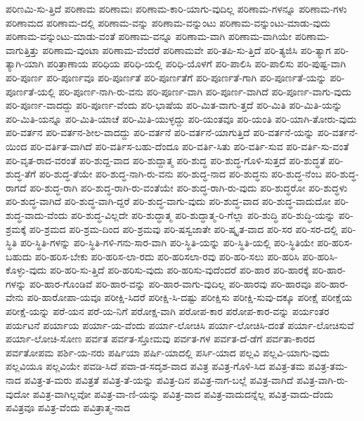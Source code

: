 {ಪರಿಣಮಿ-ಸು-ತ್ತಿದೆ
ಪರಿಣಾಮ
ಪರಿಣಾಮಃ
ಪರಿಣಾಮ-ಕಾರಿ-ಯಾಗು-ವುದಿಲ್ಲ
ಪರಿಣಾಮ-ಗಳನ್ನೂ
ಪರಿಣಾಮ-ಗಳು
ಪರಿಣಾಮದ
ಪರಿಣಾಮ-ದಲ್ಲಿ
ಪರಿಣಾಮ-ವನ್ನು
ಪರಿಣಾಮ-ವನ್ನುಂಟು
ಪರಿಣಾಮ-ವನ್ನುಂಟು-ಮಾಡು-ವುದು
ಪರಿಣಾಮ-ವನ್ನುಂಟು-ಮಾಡು-ವಂತೆ
ಪರಿಣಾಮ-ವನ್ನೂ
ಪರಿಣಾಮ-ವಾಗಿ
ಪರಿಣಾಮ-ವಾಗಿಯೇ
ಪರಿಣಾಮ-ವಾಗುತ್ತಿತ್ತು
ಪರಿಣಾಮ-ವುಂಟಾ
ಪರಿಣಾಮ-ವೆಂದರೆ
ಪರಿಣಾಮವೇ
ಪರಿ-ತಪಿ-ಸು-ತ್ತಿದೆ
ಪರಿ-ತ್ಯಜಿಸಿ
ಪರಿ-ತ್ಯಾಗ
ಪರಿ-ತ್ಯಾಗಿ-ಯಾಗಿ
ಪರಿತ್ರಾಣಾಯ
ಪರಿಧಿಯ
ಪರಿಧಿ-ಯಲ್ಲಿ
ಪರಿಧಿ-ಯೊಳಗೆ
ಪರಿ-ಪಾಲಿಸಿ
ಪರಿ-ಪಾಲಿಸು
ಪರಿ-ಪುಷ್ಟ-ವಾಗಿ
ಪರಿ-ಪೂರ್ಣ
ಪರಿ-ಪೂರ್ಣವೂ
ಪರಿ-ಪೂರ್ಣತೆ
ಪರಿ-ಪೂರ್ಣತೆಗೆ
ಪರಿ-ಪೂರ್ಣತೆ-ಗಾಗಿ
ಪರಿ-ಪೂರ್ಣತೆ-ಯನ್ನು
ಪರಿ-ಪೂರ್ಣತೆ-ಯಲ್ಲಿ
ಪರಿ-ಪೂರ್ಣ-ನಾಗಿ-ರು-ವನು
ಪರಿ-ಪೂರ್ಣ-ವಾಗಿ
ಪರಿ-ಪೂರ್ಣ-ವಾಗಿದೆ
ಪರಿ-ಪೂರ್ಣ-ವಾಗು-ವುದು
ಪರಿ-ಪೂರ್ಣ-ವಾದದ್ದು
ಪರಿ-ಪೂರ್ಣ-ವೆಂದು
ಪರಿ-ಭಾಷೆಯ
ಪರಿ-ಮಿತ-ವಾಗು-ತ್ತದೆ
ಪರಿ-ಮಿತಿ
ಪರಿ-ಮಿತಿ-ಯನ್ನು
ಪರಿ-ಮಿತಿ-ಯನ್ನೂ
ಪರಿ-ಮಿತಿ-ಯಾಚೆ
ಪರಿ-ಮಿತಿ-ಯುಳ್ಳದ್ದು
ಪರಿ-ಯಂತವೂ
ಪರಿ-ಯಂತಿ
ಪರಿ-ಯಾಗಿ-ತೋರು-ವುದು
ಪರಿ-ವರ್ತನ
ಪರಿ-ವರ್ತನ-ಶೀಲ-ವಾದದ್ದು
ಪರಿ-ವರ್ತನೆ
ಪರಿ-ವರ್ತನೆ-ಯಾಗುತ್ತಿದೆ
ಪರಿ-ವರ್ತನೆ-ಯನ್ನು
ಪರಿ-ವರ್ತನೆ-ಯಿಂದ
ಪರಿ-ವರ್ತಿತ-ವಾಗಿದೆ
ಪರಿ-ವರ್ತಿಸ-ಬಹು-ದೆಂದೂ
ಪರಿ-ವರ್ತಿ-ಸಿತು
ಪರಿ-ವರ್ತಿ-ಸುವ
ಪರಿ-ವರ್ತಿ-ಸು-ವಂತೆ
ಪರಿ-ವೃತ-ರಾದ-ವರಂತೆ
ಪರಿ-ಶುದ್ದ-ವಾದ
ಪರಿ-ಶುದ್ದಾತ್ಮ
ಪರಿ-ಶುದ್ಧ
ಪರಿ-ಶುದ್ಧ-ಗೊಳಿ-ಸುತ್ತದೆ
ಪರಿ-ಶುದ್ಧತೆ
ಪರಿ-ಶುದ್ಧ-ತೆಗೆ
ಪರಿ-ಶುದ್ಧ-ತೆಯೇ
ಪರಿ-ಶುದ್ಧ-ನಾಗಿ-ರು-ವನು
ಪರಿ-ಶುದ್ಧ-ನಾದ
ಪರಿ-ಶುದ್ಧನು
ಪರಿ-ಶುದ್ಧ-ನೆಂಬ
ಪರಿ-ಶುದ್ಧ-ರಾಗದೆ
ಪರಿ-ಶುದ್ಧ-ರಾಗಿ
ಪರಿ-ಶುದ್ಧ-ರಾಗಿ-ರು-ವಂತೆಯೇ
ಪರಿ-ಶುದ್ಧ-ರಾಗಿ-ರು-ವುದು
ಪರಿ-ಶುದ್ಧರೋ
ಪರಿ-ಶುದ್ಧಳು
ಪರಿ-ಶುದ್ಧ-ವಾಗಿದೆ
ಪರಿ-ಶುದ್ಧ-ವಾಗಿ-ದ್ದರೆ
ಪರಿ-ಶುದ್ಧ-ವಾಗು-ವುದು
ಪರಿ-ಶುದ್ಧ-ವಾದ
ಪರಿ-ಶುದ್ಧ-ವಾದುದೋ
ಪರಿ-ಶುದ್ಧ-ವಾದು-ವೆಂದು
ಪರಿ-ಶುದ್ಧ-ವಿಲ್ಲದೇ
ಪರಿ-ಶುದ್ಧಾತ್ಮ
ಪರಿ-ಶುದ್ಧಾತ್ಮ-ರಿ-ಗೆಲ್ಲಾ
ಪರಿ-ಶುದ್ಧಿ
ಪರಿ-ಶುದ್ಧಿ-ಯನ್ನು
ಪರಿ-ಶ್ರಮಕ್ಕೆ
ಪರಿ-ಶ್ರಮದ
ಪರಿ-ಶ್ರಮ-ದಿಂದ
ಪರಿ-ಶ್ರಮವು
ಪರಿ-ಷಸ್ವಜಾತೇ
ಪರಿ-ಷ್ಕೃತ-ವಾದ
ಪರಿ-ಸರ
ಪರಿ-ಸರ-ದಲ್ಲಿ
ಪರಿ-ಸ್ಥಿತಿ
ಪರಿ-ಸ್ಥಿತಿ-ಗಳನ್ನು
ಪರಿ-ಸ್ಥಿತಿ-ಗಳಿ-ಗನು-ಸಾರ-ವಾಗಿ
ಪರಿ-ಸ್ಥಿತಿ-ಯನ್ನು
ಪರಿ-ಸ್ಥಿತಿ-ಯಲ್ಲಿ
ಪರಿ-ಸ್ಥಿತಿಯೇ
ಪರಿ-ಹರಿಸ-ಬಹುದು
ಪರಿ-ಹರಿಸ-ಬೇಕು
ಪರಿ-ಹರಿಸ-ಲಾ-ರದು
ಪರಿ-ಹರಿಸಲಾ-ರವು
ಪರಿ-ಹರಿ-ಸಲು
ಪರಿ-ಹರಿಸಿ
ಪರಿ-ಹರಿಸಿ-ಕೊಳ್ಳು-ವುದು
ಪರಿ-ಹರಿ-ಸು-ತ್ತಿದೆ
ಪರಿ-ಹರಿಸು-ವುದು
ಪರಿ-ಹರಿಸು-ವುದೆಂದರೆ
ಪರಿ-ಹಾರ
ಪರಿ-ಹಾರಕ್ಕೆ
ಪರಿ-ಹಾರ-ಗಳನ್ನು
ಪರಿ-ಹಾರ-ಗೊಂಡಿವೆ
ಪರಿ-ಹಾರ-ವನ್ನು
ಪರಿ-ಹಾರ-ವಾಗು-ವುದಿಲ್ಲ
ಪರಿ-ಹಾರವು
ಪರಿ-ಹಾರವೂ
ಪರಿ-ಹಾರ-ವೇನು
ಪರಿ-ಹಾರೋಪಾ-ಯವೂ
ಪರೀಕ್ಷಿ-ಸಿದರೆ
ಪರೀಕ್ಷಿ-ಸಿ-ದಷ್ಟು
ಪರೀಕ್ಷಿಸು
ಪರೀಕ್ಷಿ-ಸುವು-ದಕ್ಕೂ
ಪರೀಕ್ಷೆ
ಪರೀಕ್ಷೆಯ
ಪರೀಕ್ಷೆ-ಯನ್ನು
ಪರೆ-ಯನ
ಪರೆ-ಯ-ನಿಗೆ
ಪರೋಕ್ಷ-ವಾಗಿ
ಪರೋಪ-ಕಾರ
ಪರೋಪ-ಕಾರ-ವನ್ನು
ಪರ್ಯಂತರ
ಪರ್ಯಟನೆ
ಪರ್ಯಾಯ
ಪರ್ಯಾ-ಯ-ವೆಂದು
ಪರ್ಯಾ-ಲೋಚಿಸಿ
ಪರ್ಯಾ-ಲೋಚಿಸಿ-ದಂತೆ
ಪರ್ಯಾ-ಲೋಚಿಸುವೆ
ಪರ್ಯಾ-ಲೋಚಿ-ಸೋಣ
ಪರ್ವತ
ಪರ್ವತ-ಸ್ತೋಮವು
ಪರ್ವತ-ಗಳ
ಪರ್ವತ-ದೆ-ಡೆಗೆ
ಪರ್ವತಾ-ಕಾರದ
ಪರ್ವತೋಪಮ
ಪರ್ಶಿ-ಯ-ನರು
ಪರ್ಷಿಯಾ
ಪರ್ಷಿ-ಯಾದಲ್ಲಿ
ಪರ್ಸಿ-ಯಾದ
ಪಲ್ಲವಿ
ಪಲ್ಲವಿ-ಯಾಗು-ವುದು
ಪಲ್ಲವಿಯೂ
ಪಲ್ಲವಿಯೇ
ಪವಡಿ-ಸಿದೆ
ಪವಾ-ಡ-ಸದೃಶ-ವಾದ
ಪವಿತ್ರ
ಪವಿತ್ರ-ಗೊಳಿ-ಸಿದ
ಪವಿತ್ರ-ತಮ
ಪವಿತ್ರ-ತಮ-ನಾದ
ಪವಿತ್ರ-ತ-ಮರು
ಪವಿತ್ರತೆ
ಪವಿತ್ರ-ತೆ-ಯನ್ನು
ಪವಿತ್ರ-ದಿನ
ಪವಿತ್ರ-ನಾಗ-ಬಲ್ಲೆ
ಪವಿತ್ರ-ವಾಗಿದೆ
ಪವಿತ್ರ-ವಾಗಿ-ರು-ವುದೋ
ಪವಿತ್ರ-ವಾಗಿಲ್ಲವೋ
ಪವಿತ್ರ-ವಾ-ಣಿ-ಯನ್ನು
ಪವಿತ್ರ-ವಾದ
ಪವಿತ್ರ-ವಾದುದನ್ನೆಲ್ಲ
ಪವಿತ್ರ-ವಾದು-ದೆಂದು
ಪವಿತ್ರವೂ
ಪವಿತ್ರ-ವೆಂದು
ಪವಿತ್ರಾತ್ಮ-ನಾದ
}
